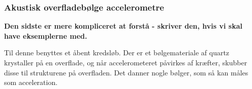 \subsubsection{Akustisk overfladebølge accelerometre}
\textbf{Den sidste er mere kompliceret at forstå - skriver den, hvis vi skal have eksemplerne med. }

Til denne benyttes et åbent kredsløb. Der er et bølgemateriale af quartz krystaller på en overflade, og når accelerometeret påvirkes af kræfter, skubber disse til strukturene på overfladen. Det danner nogle bølger, som så kan måles som acceleration. 



%
